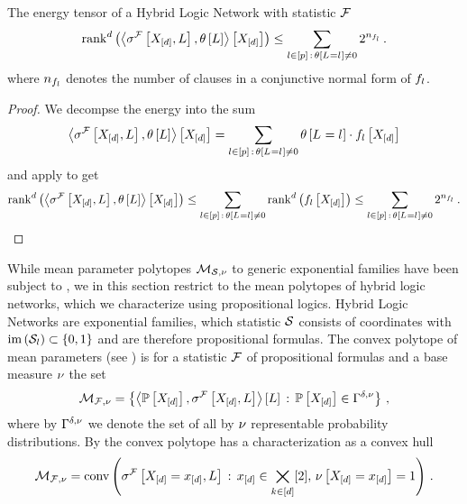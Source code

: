 \begin{corollary}
    The energy tensor of a Hybrid Logic Network with statistic $\mathcal{F}$
    \begin{align*}
        \mathrm{rank}^{d}\left(\left\langle \sigma^{\mathcal{F}}\left[X_{[d]},L\right],\theta\left[L\right]\right\rangle \left[ X_{[d]} \right]\right) \leq \sum_{l\in[p]\,:\,\theta\left[L_{}=l_{}\right]\neq0} 2^{n_{f_{l}}} \, .
    \end{align*}
    where $n_{f_{l}}$ denotes the number of clauses in a conjunctive normal form of $f_{l}$.
\end{corollary}
\begin{proof}
    We decompse the energy into the sum
    \begin{align*}
        \left\langle \sigma^{\mathcal{F}}\left[X_{[d]},L\right],\theta\left[L\right]\right\rangle \left[ X_{[d]} \right]
        = \sum_{l\in[p]\,:\,\theta\left[L_{}=l_{}\right]\neq0} \theta\left[L_{}=l_{}\right] \cdot f_{l}\left[X_{[d]}\right]
    \end{align*}
    and apply  to get
    \begin{align*}
        \mathrm{rank}^{d}\left(\left\langle \sigma^{\mathcal{F}}\left[X_{[d]},L\right],\theta\left[L\right]\right\rangle \left[ X_{[d]} \right]\right)
        \leq \sum_{l\in[p]\,:\,\theta\left[L_{}=l_{}\right]\neq0} \mathrm{rank}^{d}\left(f_{l}\left[X_{[d]}\right]\right)
        \leq \sum_{l\in[p]\,:\,\theta\left[L_{}=l_{}\right]\neq0}2^{n_{f_{l}}} \, .
    \end{align*}
\end{proof}



While mean parameter polytopes $\mathcal{M}_{\mathcal{S},\nu}$ to generic exponential families have been subject to , we in this section restrict to the mean polytopes of hybrid logic networks, which we characterize using propositional logics.
Hybrid Logic Networks are exponential families, which statistic $\mathcal{S}$ consists of coordinates with $\mathrm{im}\left(\mathcal{S}_{l}\right)\subset\{0,1\}$ and are therefore propositional formulas.
The convex polytope of mean parameters (see ) is for a statistic $\mathcal{F}$ of propositional formulas and a base measure $\nu$ the set
\begin{align*}
    \mathcal{M}_{\mathcal{F},\nu} = \left\{ \left\langle \mathbb{P}\left[X_{[d]}\right],\sigma^{\mathcal{F}}\left[X_{[d]},L\right]\right\rangle \left[ L \right] \, : \, \mathbb{P}\left[X_{[d]}\right]\in\Gamma^{\delta,\nu} \right\} \, ,
\end{align*}
where by $\Gamma^{\delta,\nu}$ we denote the set of all by $\nu$ representable probability distributions.
By  the convex polytope has a characterization as a convex hull
\begin{align}
    \label{eq:hlnMeansetConvCharacterization}
    \mathcal{M}_{\mathcal{F},\nu}
    = \mathrm{conv}\left(\sigma^{\mathcal{F}}\left[X_{[d]}=x_{[d]},L\right] \, : \, x_{[d]}\in\bigtimes_{k\in[d]}[2], \, \nu\left[X_{[d]}=x_{[d]}\right]=1\right) \, .
\end{align}

